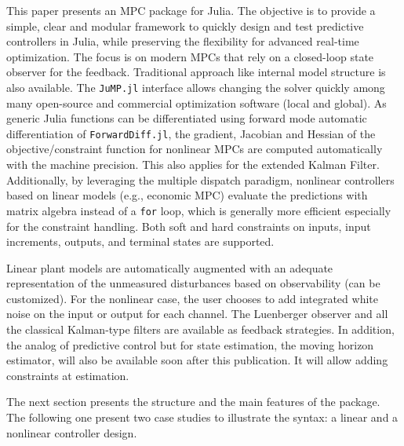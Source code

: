 This paper presents an MPC package for Julia. The objective is to provide a simple, clear and modular framework to quickly design and test predictive controllers in Julia, while preserving the flexibility for advanced real-time optimization. The focus is on modern MPCs that rely on a closed-loop state observer for the feedback. Traditional approach like internal model structure is also available. The \texttt{JuMP.jl} interface allows changing the solver quickly among  many open-source and commercial optimization software (local and global). As generic Julia functions can be differentiated using forward mode automatic differentiation of \texttt{ForwardDiff.jl}, the gradient, Jacobian and Hessian of the objective/constraint function for nonlinear MPCs are computed automatically with the machine precision. This also applies for the extended Kalman Filter. Additionally, by leveraging the multiple dispatch paradigm, nonlinear
controllers based on linear models (e.g., economic MPC) evaluate the predictions with matrix algebra instead of a \texttt{for} loop, which is generally more efficient especially for the constraint handling. Both soft and hard constraints on inputs, input increments, outputs, and terminal states are supported. 

Linear plant models are automatically augmented with an adequate representation of the unmeasured disturbances based on observability (can be customized). For the nonlinear case, the user chooses to add integrated white noise on the input or output for each channel. The Luenberger observer and all the classical Kalman-type filters are available as feedback strategies. In addition, the analog of predictive control but for state estimation, the moving horizon estimator, will also be available soon after this publication. It will allow adding constraints at estimation.

The next section presents the structure and the main features of the package. The following one present two case studies to illustrate the syntax: a linear and a nonlinear controller design.